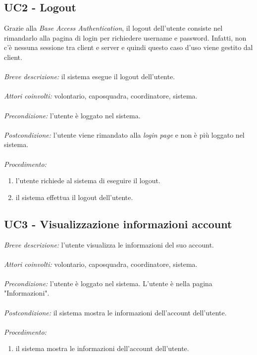 \subsection{UC2 - Logout}
Grazie alla \textit{Base Access Authentication}, il logout dell'utente consiste nel rimandarlo alla pagina di login per richiedere username e password. Infatti, non c'è nessuna sessione tra client e server e quindi questo caso d'uso viene gestito dal client.
\\
\\ 
\textit{Breve descrizione:} il sistema esegue il logout dell'utente.
\\
\\
\textit{Attori coinvolti:} volontario, caposquadra, coordinatore, sistema.
\\
\\
\textit{Precondizione:} l'utente è loggato nel sistema.
\\
\\
\textit{Postcondizione:} l'utente viene rimandato alla \textit{login page} e non è più loggato nel sistema.
\\
\\
\textit{Procedimento:}
\begin{enumerate}
	\item l'utente richiede al sistema di eseguire il logout.
	\item il sistema effettua il logout dell'utente.
\end{enumerate}

\subsection{UC3 - Visualizzazione informazioni account}
\textit{Breve descrizione:} l'utente visualizza le informazioni del suo account.
\\
\\
\textit{Attori coinvolti:} volontario, caposquadra, coordinatore, sistema. 
\\
\\
\textit{Precondizione:} l'utente è loggato nel sistema. L'utente è nella pagina "Informazioni".
\\
\\
\textit{Postcondizione:} il sistema mostra le informazioni dell'account dell'utente.
\\
\\
\textit{Procedimento:}
\begin{enumerate}
	\item il sistema mostra le informazioni dell'account dell'utente.
\end{enumerate}


